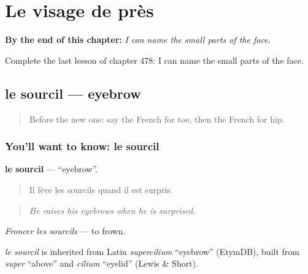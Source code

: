 
\chapter{Le visage de près}
\label{ch:fr-le-visage-de-pres}

\begin{chapteropening}
\textbf{By the end of this chapter:} \emph{I can name the small parts of the face.}

Complete the last lesson of chapter 478: I can name the small parts of the face.
\end{chapteropening}

\section[le sourcil]{le sourcil — eyebrow}

\label{lesson:FR-C478-sourcil}



\begin{quote}
Before the new one: say the French for toe, then the French for hip.
\end{quote}

\subsection*{You'll want to know: le sourcil}
\textbf{le sourcil} — \textquotedblleft{}eyebrow\textquotedblright{}.

\begin{quote}
Il lève les sourcils quand il est surpris.
\end{quote}

\begin{quote}
\emph{He raises his eyebrows when he is surprised.}
\end{quote}

\emph{Froncer les sourcils} — to frown.

\begin{cousinweb}
\emph{le sourcil} is inherited from Latin \emph{supercilium} \textquotedblleft{}eyebrow\textquotedblright{} (EtymDB), built from \emph{super} \textquotedblleft{}above\textquotedblright{} and \emph{cilium} \textquotedblleft{}eyelid\textquotedblright{} (Lewis \& Short).
\end{cousinweb}


